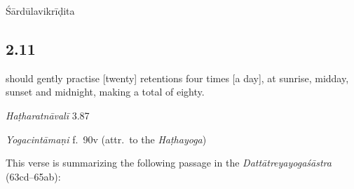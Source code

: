 \begin{ekdosis}
\begin{metre}[hp02_010]
Śārdūlavikrīḍita 
\end{metre}

\subsection*{2.11}
\begin{translation} should gently practise [twenty] retentions  four times [a day], at sunrise, midday, sunset and midnight, making a total of eighty.
\end{translation}


\begin{testimonia}[hp02_011]
\emph{Haṭharatnāvalī} 3.87

\begin{versinnote}
\end{versinnote}

\emph{Yogacintāmaṇi} f.~90v (attr.~to the \emph{Haṭhayoga})
\begin{versinnote}
\end{versinnote}

\end{testimonia}

\begin{philcomm}[hp02_011]
This verse is summarizing the following passage in the \emph{Dattātreyayogaśāstra} (63cd--65ab):

\begin{versinnote}
\end{versinnote}


\end{philcomm}
\end{ekdosis}
